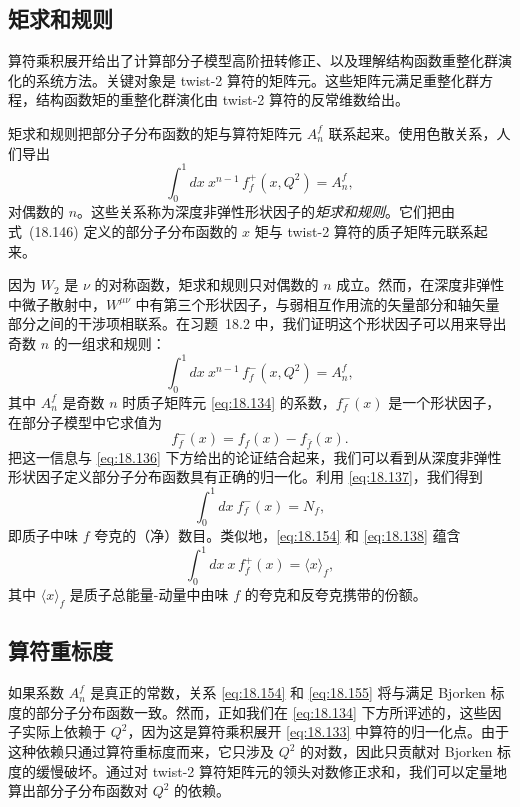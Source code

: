 \subsection{矩求和规则}

算符乘积展开给出了计算部分子模型高阶扭转修正、以及理解结构函数重整化群演化的系统方法。关键对象是 twist-2 算符的矩阵元。这些矩阵元满足重整化群方程，结构函数矩的重整化群演化由 twist-2 算符的反常维数给出。

矩求和规则把部分子分布函数的矩与算符矩阵元 $A_n^f$ 联系起来。使用色散关系，人们导出
\begin{equation}
  \int_0^1 dx\ x^{n-1}\,f_f^+(x, Q^2) = A_n^f ,
  \label{eq:18.154}
\end{equation}
对偶数的 $n$。这些关系称为深度非弹性形状因子的\emph{矩求和规则}。它们把由式~(18.146) 定义的部分子分布函数的 $x$ 矩与 twist-2 算符的质子矩阵元联系起来。

因为 $W_2$ 是 $\nu$ 的对称函数，矩求和规则只对偶数的 $n$ 成立。然而，在深度非弹性中微子散射中，$W^{\mu\nu}$ 中有第三个形状因子，与弱相互作用流的矢量部分和轴矢量部分之间的干涉项相联系。在习题~18.2 中，我们证明这个形状因子可以用来导出奇数 $n$ 的一组求和规则：
\begin{equation}
  \int_0^1 dx\ x^{n-1}\,f_f^-(x, Q^2) = A_n^f ,
  \label{eq:18.155}
\end{equation}
其中 $A_n^f$ 是奇数 $n$ 时质子矩阵元 \eqref{eq:18.134} 的系数，$f_f^-(x)$ 是一个形状因子，在部分子模型中它求值为
\begin{equation}
  f_f^-(x) = f_f(x) - f_{\bar{f}}(x) .
  \label{eq:18.156}
\end{equation}
把这一信息与 \eqref{eq:18.136} 下方给出的论证结合起来，我们可以看到从深度非弹性形状因子定义部分子分布函数具有正确的归一化。利用 \eqref{eq:18.137}，我们得到
\begin{equation}
  \int_0^1 dx\ f_f^-(x) = N_f ,
  \label{eq:18.157}
\end{equation}
即质子中味 $f$ 夸克的（净）数目。类似地，\eqref{eq:18.154} 和 \eqref{eq:18.138} 蕴含
\begin{equation}
  \int_0^1 dx\ x\,f_f^+(x) = \langle x\rangle_f ,
  \label{eq:18.158}
\end{equation}
其中 $\langle x\rangle_f$ 是质子总能量-动量中由味 $f$ 的夸克和反夸克携带的份额。

\subsection{算符重标度}

如果系数 $A_n^f$ 是真正的常数，关系 \eqref{eq:18.154} 和 \eqref{eq:18.155} 将与满足 Bjorken 标度的部分子分布函数一致。然而，正如我们在 \eqref{eq:18.134} 下方所评述的，这些因子实际上依赖于 $Q^2$，因为这是算符乘积展开 \eqref{eq:18.133} 中算符的归一化点。由于这种依赖只通过算符重标度而来，它只涉及 $Q^2$ 的对数，因此只贡献对 Bjorken 标度的缓慢破坏。通过对 twist-2 算符矩阵元的领头对数修正求和，我们可以定量地算出部分子分布函数对 $Q^2$ 的依赖。

